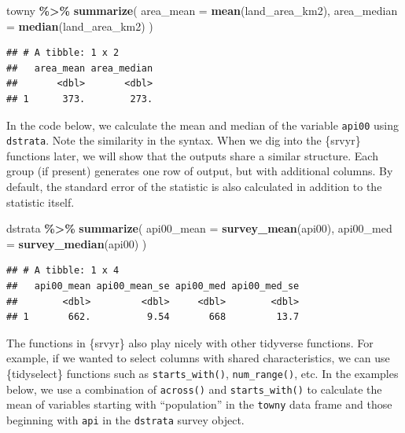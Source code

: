 \documentclass[
]{krantz}
\makeatletter
\newenvironment{Shaded}{\begin{snugshade}}{\end{snugshade}}
\newcommand{\AttributeTok}[1]{\textcolor[rgb]{0.27,0.27,0.27}{#1}}
\newcommand{\FunctionTok}[1]{\textcolor[rgb]{0.27,0.27,0.27}{\textbf{#1}}}
\newcommand{\NormalTok}[1]{#1}
\newcommand{\SpecialCharTok}[1]{\textcolor[rgb]{0.43,0.43,0.43}{\textbf{#1}}}
\newenvironment{kframe}{%
\medskip{}
\setlength{\fboxsep}{.8em}
 \def\at@end@of@kframe{}%
 \ifinner\ifhmode%
  \def\at@end@of@kframe{\end{minipage}}%
  \begin{minipage}{\columnwidth}%
 \fi\fi%
 \def\FrameCommand##1{\hskip\@totalleftmargin \hskip-\fboxsep
 \colorbox{shadecolor}{##1}\hskip-\fboxsep
     \hskip-\linewidth \hskip-\@totalleftmargin \hskip\columnwidth}%
 \MakeFramed {\advance\hsize-\width
   \@totalleftmargin\z@ \linewidth\hsize
   \@setminipage}}%
 {\par\unskip\endMakeFramed%
 \at@end@of@kframe}
\renewenvironment{Shaded}{\begin{kframe}}{\end{kframe}}
\makeatother
\begin{document}
\begin{Shaded}
\begin{Highlighting}[]
\NormalTok{towny }\SpecialCharTok{\%\textgreater{}\%}
  \FunctionTok{summarize}\NormalTok{(}
    \AttributeTok{area\_mean =} \FunctionTok{mean}\NormalTok{(land\_area\_km2),}
    \AttributeTok{area\_median =} \FunctionTok{median}\NormalTok{(land\_area\_km2)}
\NormalTok{  )}
\end{Highlighting}
\end{Shaded}

\begin{verbatim}
## # A tibble: 1 x 2
##   area_mean area_median
##       <dbl>       <dbl>
## 1      373.        273.
\end{verbatim}

In the code below, we calculate the mean and median of the variable \texttt{api00} using \texttt{dstrata}. Note the similarity in the syntax. When we dig into the \{srvyr\} functions later, we will show that the outputs share a similar structure. Each group (if present) generates one row of output, but with additional columns. By default, the standard error of the statistic is also calculated in addition to the statistic itself.

\begin{Shaded}
\begin{Highlighting}[]
\NormalTok{dstrata }\SpecialCharTok{\%\textgreater{}\%}
  \FunctionTok{summarize}\NormalTok{(}
    \AttributeTok{api00\_mean =} \FunctionTok{survey\_mean}\NormalTok{(api00),}
    \AttributeTok{api00\_med =} \FunctionTok{survey\_median}\NormalTok{(api00)}
\NormalTok{  )}
\end{Highlighting}
\end{Shaded}

\begin{verbatim}
## # A tibble: 1 x 4
##   api00_mean api00_mean_se api00_med api00_med_se
##        <dbl>         <dbl>     <dbl>        <dbl>
## 1       662.          9.54       668         13.7
\end{verbatim}

The functions in \{srvyr\} also play nicely with other tidyverse functions. For example, if we wanted to select columns with shared characteristics, we can use \{tidyselect\} functions such as \texttt{starts\_with()}, \texttt{num\_range()}, etc. In the examples below, we use a combination of \texttt{across()} and \texttt{starts\_with()} to calculate the mean of variables starting with ``population'' in the \texttt{towny} data frame and those beginning with \texttt{api} in the \texttt{dstrata} survey object.
\end{document}
